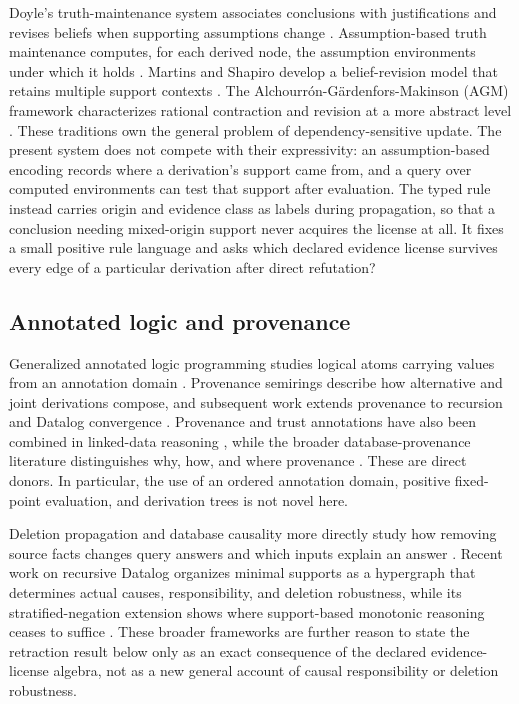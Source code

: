 \documentclass[pdflatex,sn-mathphys-num]{sn-jnl}
\begin{document}
Doyle's truth-maintenance system associates conclusions with justifications and revises beliefs when supporting assumptions change \citep{doyle1979}. Assumption-based truth maintenance computes, for each derived node, the assumption environments under which it holds \citep{dekleer1986}. Martins and Shapiro develop a belief-revision model that retains multiple support contexts \citep{martins1988}. The Alchourrón-Gärdenfors-Makinson (AGM) framework characterizes rational contraction and revision at a more abstract level \citep{agm1985}. These traditions own the general problem of dependency-sensitive update. The present system does not compete with their expressivity: an assumption-based encoding records where a derivation's support came from, and a query over computed environments can test that support after evaluation. The typed rule instead carries origin and evidence class as labels during propagation, so that a conclusion needing mixed-origin support never acquires the license at all. It fixes a small positive rule language and asks which declared evidence license survives every edge of a particular derivation after direct refutation?

\subsection{Annotated logic and provenance}\label{annotated-logic-and-provenance}

Generalized annotated logic programming studies logical atoms carrying values from an annotation domain \citep{kifer1992}. Provenance semirings describe how alternative and joint derivations compose, and subsequent work extends provenance to recursion and Datalog convergence \citep{green2007, bourgaux2022, abokhamis2022}. Provenance and trust annotations have also been combined in linked-data reasoning \citep{bonatti2011}, while the broader database-provenance literature distinguishes why, how, and where provenance \citep{cheney2009}. These are direct donors. In particular, the use of an ordered annotation domain, positive fixed-point evaluation, and derivation trees is not novel here.

Deletion propagation and database causality more directly study how removing source facts changes query answers and which inputs explain an answer \citep{buneman2002, meliou2010}. Recent work on recursive Datalog organizes minimal supports as a hypergraph that determines actual causes, responsibility, and deletion robustness, while its stratified-negation extension shows where support-based monotonic reasoning ceases to suffice \citep{thapa2026minimal, thapa2026stratified}. These broader frameworks are further reason to state the retraction result below only as an exact consequence of the declared evidence-license algebra, not as a new general account of causal responsibility or deletion robustness.
\end{document}
